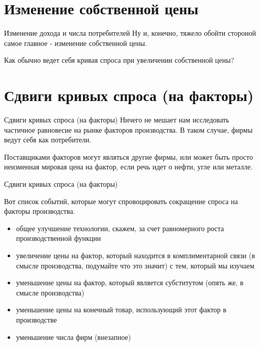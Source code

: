 \documentclass{beamer}
\begin{document}
\section{Изменение собственной цены}
\begin{frame}{Изменение дохода и числа потребителей}
Ну и, конечно, тяжело обойти стороной самое главное - изменение собственной цены.

Как обычно ведет себя кривая спроса при увеличении собственной цены?
\end{frame}

\section{Сдвиги кривых спроса (на факторы)}

\begin{frame}{Сдвиги кривых спроса (на факторы)}
Ничего не мешает нам исследовать частичное равновесие на рынке факторов производства. В таком случае, фирмы ведут себя как потребители. 

Поставщиками факторов могут являться другие фирмы, или может быть просто неизменная мировая цена на фактор, если речь идет о нефти, угле или металле.
	
\end{frame}

\begin{frame}{Сдвиги кривых спроса (на факторы)}

Вот список событий, которые могут спровоцировать сокращение спроса на факторы производства.

\begin{itemize}
\item общее улучшение технологии, скажем, за счет равномерного роста производственной функции
\item увеличение цены на фактор, который находится в комплиментарной связи (в смысле производства, подумайте  что это значит) с тем, который мы изучаем
\item уменьшение цены на фактор, который является субститутом (опять же, в смысле производства)
\item уменьшение цены на конечный товар, использующий этот фактор в производстве
\item уменьшение числа фирм (внезапное)
\end{itemize}
	
\end{frame}
\end{document}
